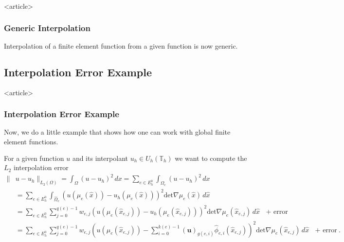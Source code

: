 \begin{frame}<article>
\frametitle{Generic Interpolation}
Interpolation of a finite element function from a given function is
now generic.
\end{frame}

%


\subsection{Interpolation Error Example}

\begin{frame}<article>
\frametitle{Interpolation Error Example}
Now, we do a little example that shows how one can work with global
finite element functions.

For a given function $u$ and its interpolant $u_h\in
U_h(\mathbb{T}_h)$ we want to compute the $L_2$ interpolation error 
\begin{equation*}
\begin{split}
\|&u-u_h\|_{L_2(\Omega)} = \int_\Omega (u-u_h)^2\, dx 
= \sum_{e\in E_h^0} \int_{\Omega_e} (u-u_h)^2\, dx \\
&= \sum_{e\in E_h^0} \int_{\hat{\Omega}_e} \left(u(\mu_e(\hat{x})) -
u_h(\mu_e(\hat{x})) \right)^2 \text{det} \nabla\mu_e(\hat{x}) \,
d\hat{x}\\
&= \sum_{e\in E_h^0} \sum_{j=0}^{q(e)-1} w_{e,j} \left( u(\mu_e(\hat{x}_{e,j})) -
u_h(\mu_e(\hat{x}_{e,j})) \right)^2 \text{det} \nabla\mu_e(\hat{x}_{e,j}) \,
d\hat{x} \text{ $+$ error}\\
&= \sum_{e\in E_h^0} \sum_{j=0}^{q(e)-1} w_{e,j} \left(u(\mu_e(\hat{x}_{e,j})) -
\sum_{i=0}^{k(e)-1}(\mathbf{u})_{g(e,i)} \hat\phi_{e,i}(\hat{x}_{e,j}) \right)^2  
\text{det} \nabla\mu_e(\hat{x}_{e,j}) \,  
d\hat{x} \text{ $+$ error} .
\end{split}
\end{equation*}
\end{frame}

